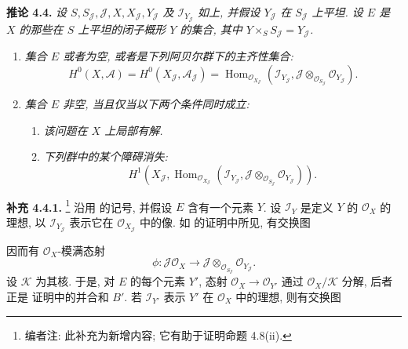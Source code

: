 \medskip
\noindent{}\textbf{推论 4.4.}
\textit{设 \(S,S_{\mathscr J},\mathscr J,X,X_{\mathscr J},
Y_{\mathscr J}\) 及 \(\mathscr I_{Y_{\mathscr J}}\) 如上,
并假设 \(Y_{\mathscr J}\) 在 \(S_{\mathscr J}\) 上平坦.
设 \(E\) 是 \(X\) 的那些在 \(S\) 上平坦的闭子概形
\(Y\) 的集合, 其中 \(Y\times_S S_{\mathscr J}=Y_{\mathscr J}\).}
\begin{enumerate}
\item[(i)] \textit{集合 \(E\) 或者为空,
或者是下列阿贝尔群下的主齐性集合:}
\[
 H^0(X,\mathscr A)=H^0(X_{\mathscr J},\mathscr A_{\mathscr J})
 =\operatorname{Hom}_{\mathscr O_{X_{\mathscr J}}}
 \left(
  \mathscr I_{Y_{\mathscr J}},
  \mathscr J\otimes_{\mathscr O_{S_{\mathscr J}}}
  \mathscr O_{Y_{\mathscr J}}
 \right).
\]

\item[(ii)] \textit{集合 \(E\) 非空, 当且仅当以下两个条件同时成立:}
\begin{enumerate}
\item[(a)] \textit{该问题在 \(X\) 上局部有解.}
\item[(b)] \textit{下列群中的某个障碍消失:}
\[
 H^1\!\left(
  X_{\mathscr J},
  \operatorname{Hom}_{\mathscr O_{X_{\mathscr J}}}
  \left(
   \mathscr I_{Y_{\mathscr J}},
   \mathscr J\otimes_{\mathscr O_{S_{\mathscr J}}}
   \mathscr O_{Y_{\mathscr J}}
  \right)
 \right).
\]
\end{enumerate}
\end{enumerate}

\medskip
\noindent{}\textbf{补充 4.4.1.}
\footnote{编者注: 此补充为新增内容; 它有助于证明命题 4.8(ii).}
沿用  的记号,
并假设 \(E\) 含有一个元素 \(Y\).
设 \(\mathscr I_Y\) 是定义 \(Y\) 的 \(\mathscr O_X\) 的理想,
以 \(\mathscr I_{Y_{\mathscr J}}\) 表示它在
\(\mathscr O_{X_{\mathscr J}}\) 中的像.
如  的证明中所见, 有交换图

\begin{center}
\end{center}

\noindent 因而有 \(\mathscr O_X\)-模满态射
\[
 \phi:\mathscr J\mathscr O_X\longrightarrow
 \mathscr J\otimes_{\mathscr O_{S_{\mathscr J}}}
 \mathscr O_{Y_{\mathscr J}}.
\]
设 \(\mathscr K\) 为其核.
于是, 对 \(E\) 的每个元素 \(Y'\), 态射
\(\mathscr O_X\to\mathscr O_{Y'}\) 通过
\(\mathscr O_X/\mathscr K\) 分解,
后者正是 证明中的并合和 \(B'\).
若 \(\mathscr I_{Y'}\) 表示 \(Y'\) 在 \(\mathscr O_X\) 中的理想,
则有交换图

